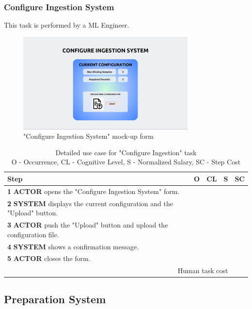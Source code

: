 \subsubsection{Configure Ingestion System}
This task is performed by a ML Engineer.

\begin{figure}[H]
\centering
\includegraphics[width=0.8\textwidth]{figures/ui_configure_ingestion.png}
\caption{"Configure Ingestion System" mock-up form}
\end{figure}

\begin{table}[H]
\centering
\begin{tabularx}{\textwidth}{|X|c|c|c|c|}
\hline
\textbf{Step} & \textbf{O} & \textbf{CL} & \textbf{S} & \textbf{SC} \\
\hline
\textbf{1} \textbf{ACTOR} opens the "Configure Ingestion System" form. &  & & & \\
\hline
\textbf{2} \textbf{SYSTEM} displays the current configuration and the "Upload" button.& & & & \\
\hline
\textbf{3} \textbf{ACTOR} push the "Upload" button and upload the configuration file. & & & &\\
\hline
\textbf{4} \textbf{SYSTEM} shows a confirmation message. & & & & \\
\hline
\textbf{5} \textbf{ACTOR} closes the form. & & & & \\
\hline
\multicolumn{4}{|r|}{Human task cost} & \\
\hline
\end{tabularx}
\caption{Detailed use case for "Configure Ingestion" task\\ 
O - Occurrence, CL - Cognitive Level, S - Normalized Salary, SC - Step Cost}
\label{table:configure_ingestion_system}
\end{table}

\subsection{Preparation System}

